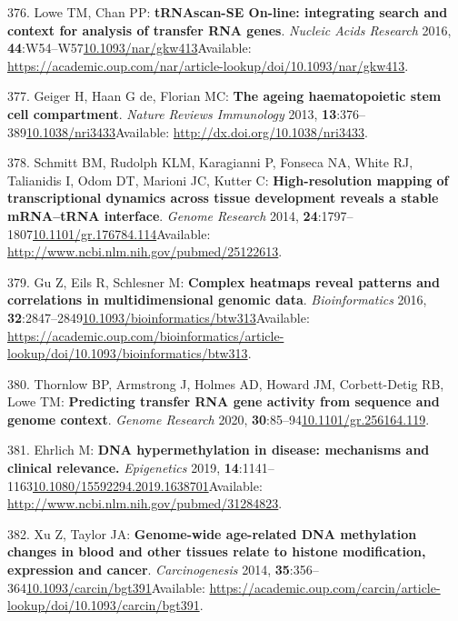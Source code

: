 \documentclass[
]{book}
\begin{document}
\leavevmode\hypertarget{ref-Lowe2016}{}%
376. Lowe TM, Chan PP: \textbf{tRNAscan-SE On-line: integrating search and context for analysis of transfer RNA genes}. \emph{Nucleic Acids Research} 2016, \textbf{44}:W54--W57\href{https://doi.org/10.1093/nar/gkw413}{10.1093/nar/gkw413}Available: \url{https://academic.oup.com/nar/article-lookup/doi/10.1093/nar/gkw413}.

\leavevmode\hypertarget{ref-Geiger2013}{}%
377. Geiger H, Haan G de, Florian MC: \textbf{The ageing haematopoietic stem cell compartment}. \emph{Nature Reviews Immunology} 2013, \textbf{13}:376--389\href{https://doi.org/10.1038/nri3433}{10.1038/nri3433}Available: \url{http://dx.doi.org/10.1038/nri3433}.

\leavevmode\hypertarget{ref-Schmitt2014b}{}%
378. Schmitt BM, Rudolph KLM, Karagianni P, Fonseca NA, White RJ, Talianidis I, Odom DT, Marioni JC, Kutter C: \textbf{High-resolution mapping of transcriptional dynamics across tissue development reveals a stable mRNA--tRNA interface}. \emph{Genome Research} 2014, \textbf{24}:1797--1807\href{https://doi.org/10.1101/gr.176784.114}{10.1101/gr.176784.114}Available: \url{http://www.ncbi.nlm.nih.gov/pubmed/25122613}.

\leavevmode\hypertarget{ref-Gu2016}{}%
379. Gu Z, Eils R, Schlesner M: \textbf{Complex heatmaps reveal patterns and correlations in multidimensional genomic data}. \emph{Bioinformatics} 2016, \textbf{32}:2847--2849\href{https://doi.org/10.1093/bioinformatics/btw313}{10.1093/bioinformatics/btw313}Available: \url{https://academic.oup.com/bioinformatics/article-lookup/doi/10.1093/bioinformatics/btw313}.

\leavevmode\hypertarget{ref-Thornlow2020}{}%
380. Thornlow BP, Armstrong J, Holmes AD, Howard JM, Corbett-Detig RB, Lowe TM: \textbf{Predicting transfer RNA gene activity from sequence and genome context}. \emph{Genome Research} 2020, \textbf{30}:85--94\href{https://doi.org/10.1101/gr.256164.119}{10.1101/gr.256164.119}.

\leavevmode\hypertarget{ref-Ehrlich2019}{}%
381. Ehrlich M: \textbf{DNA hypermethylation in disease: mechanisms and clinical relevance.} \emph{Epigenetics} 2019, \textbf{14}:1141--1163\href{https://doi.org/10.1080/15592294.2019.1638701}{10.1080/15592294.2019.1638701}Available: \url{http://www.ncbi.nlm.nih.gov/pubmed/31284823}.

\leavevmode\hypertarget{ref-Xu2014b}{}%
382. Xu Z, Taylor JA: \textbf{Genome-wide age-related DNA methylation changes in blood and other tissues relate to histone modification, expression and cancer}. \emph{Carcinogenesis} 2014, \textbf{35}:356--364\href{https://doi.org/10.1093/carcin/bgt391}{10.1093/carcin/bgt391}Available: \url{https://academic.oup.com/carcin/article-lookup/doi/10.1093/carcin/bgt391}.
\end{document}
